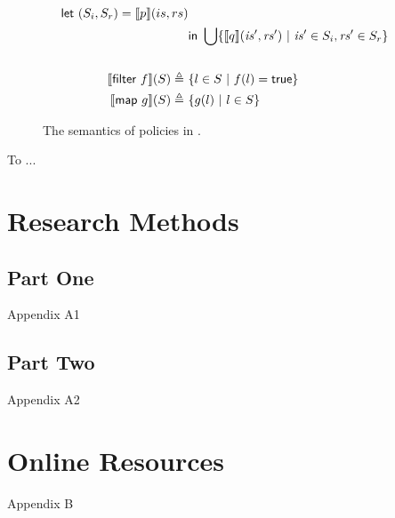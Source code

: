 \documentclass[sigconf,usenames,dvipsnames,svgnames,table]{acmart}
\begin{document}
\begin{figure}
\begin{align*}
              \mathsf{let}\ (S_i, S_r) = \llbracket p \rrbracket(is, rs)\\
              &\mathsf{in}\ \bigcup \{\llbracket q \rrbracket(\mathit{is}',\mathit{rs}')\ |\ \mathit{is}'\in S_i, \mathit{rs'}\in S_r\}\\
              \\
            \llbracket \mathsf{filter}\ f \rrbracket(S)
              \triangleq\ & \{l \in S\ |\ f(l) = \mathsf{true}\}\\
            \llbracket \mathsf{map}\ g \rrbracket(S)
              \triangleq\ &
              \{ g(l)\ |\ l\in S \}
          \end{align*}
          \caption{The semantics of policies in \oldname.}
          \label{fig:garuda:sem:pol}
        \end{figure}


\begin{acks}
To ...
\end{acks}




\appendix

\section{Research Methods}

\subsection{Part One}

Appendix A1

\subsection{Part Two}

Appendix A2

\section{Online Resources}

Appendix B
\end{document}
